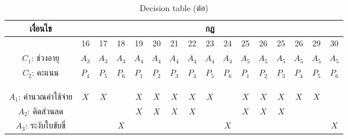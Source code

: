 \documentclass[12pt,a4paper]{report}
\newcommand{\sitdh}{นายสิทธิพงษ์ เหล่าโก้ก}
\newcommand{\sid}{5870972621}
\newcommand{\branch}{วิศวกรรมซอฟต์แวร์ ภาคนอกเวลา}
\begin{document}
\begin{landscape}
    \begin{table}
        \centering
        \caption{Decision table (ต่อ)}
        \label{desct-cont}
        \begin{tabular}{|c||c|c|c|c|c|c|c|c|c|c|c|c|c|c|c|}
            \hline
            เงื่อนไข & \multicolumn{15}{c|}{กฎ} \\ \hline \hline
                                &  16   &  17   &  18   &  19   &  20   &  21   &  22   &  23   &  24   &  25  &  26   &  25   &  26   &   29  &  30      \\ 
             $C_1$: ช่วงอายุ      & $A_3$ & $A_3$ & $A_3$ & $A_4$ & $A_4$ & $A_4$ & $A_4$ & $A_4$ & $A_4$ & $A_5$ & $A_5$ & $A_5$ & $A_5$ & $A_5$ & $A_5$   \\
             $C_2$: คะแนน       & $P_4$ & $P_5$ & $P_6$ & $P_1$ & $P_2$ & $P_3$ & $P_4$ & $P_5$ & $P_6$ & $P_1$ & $P_2$ & $P_3$ & $P_4$ & $P_5$ & $P_6$   \\ 
                                &       &       &       &       &       &       &       &       &       &       &       &       &       &       &         \\ 
                                &       &       &       &       &       &       &       &       &       &       &       &       &       &       &         \\ \hline
                                &       &       &       &       &       &       &       &       &       &       &       &       &       &       &         \\ 
            $A_1$: คำนวณค่าใช้จ่าย & $X$   & $X$   &       & $X$   & $X$   & $X$   & $X$   & $X$   &       & $X$   & $X$   & $X$   & $X$   & $X$   &         \\ 
            $A_2$: คิดส่วนลด      &       &       &       & $X$   & $X$   & $X$   & $X$   &       &       & $X$   & $X$   & $X$   &       &       &         \\ 
            $A_3$: ระงับใบขับขี่    &       &       & $X$   &       &       &       &       &       & $X$   &       &       &       &       &       & $X$     \\ \hline 

        \end{tabular}
    \end{table}
\end{landscape}


\end{document}
